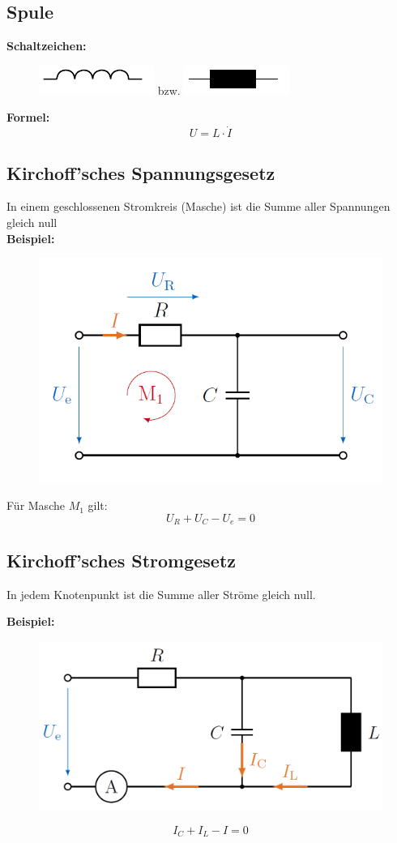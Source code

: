 \documentclass[10pt,a4paper]{article}
\begin{document}
\subsection{Spule}
\textbf{Schaltzeichen:} \\
\begin{figure}[H]
	\includegraphics[width=0.1\columnwidth]{imgs/spule.pdf} bzw. 
	\includegraphics[width=0.1\columnwidth]{imgs/spule_alt.pdf}	
\end{figure}
\textbf{Formel:}
$$
	U = L ⋅ \dot I
$$

\subsection{Kirchoff'sches Spannungsgesetz}
In einem geschlossenen Stromkreis (Masche) ist die Summe aller Spannungen gleich null \\

\textbf{Beispiel:}
\begin{figure}[H]
	\includegraphics[width=0.5\columnwidth]{imgs/kvl.png}
\end{figure}
Für Masche $M_1$ gilt:
$$
U_R + U_C - U_e = 0
$$

\subsection{Kirchoff'sches Stromgesetz}
In jedem Knotenpunkt ist die Summe aller Ströme gleich null.

\textbf{Beispiel:}
\begin{figure}[H]
	\includegraphics[width=0.5\columnwidth]{imgs/kcl.png}
\end{figure}
$$
	I_C + I_L - I = 0
$$
\end{document}
